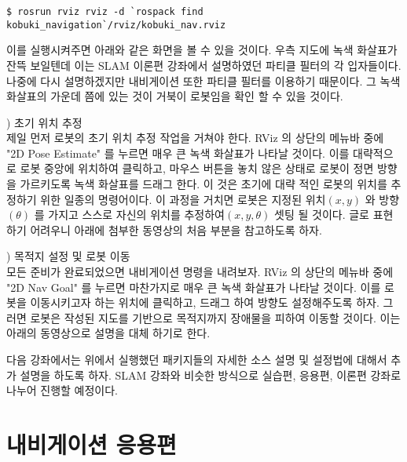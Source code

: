 \vspace{\baselineskip}
\begin{lstlisting}[language=ROS]
$ rosrun rviz rviz -d `rospack find kobuki_navigation`/rviz/kobuki_nav.rviz
\end{lstlisting}

이를 실행시켜주면 아래와 같은 화면을 볼 수 있을 것이다. 우측 지도에 녹색 화살표가 잔뜩 보일텐데 이는 SLAM 이론편 강좌에서 설명하였던 파티클 필터의 각 입자들이다. 나중에 다시 설명하겠지만 내비게이션 또한 파티클 필터를 이용하기 때문이다. 그 녹색 화살표의 가운데 쯤에 있는 것이 거북이 로봇임을 확인 할 수 있을 것이다.

\vspace{\baselineskip}
\noindent
{}
\thenum) 초기 위치 추정\\
제일 먼저 로봇의 초기 위치 추정 작업을 거쳐야 한다. RViz 의 상단의 메뉴바 중에 "2D Pose Estimate" 를 누르면 매우 큰 녹색 화살표가 나타날 것이다. 이를 대략적으로 로봇 중앙에 위치하여 클릭하고, 마우스 버튼을 놓치 않은 상태로 로봇이 정면 방향을 가르키도록 녹색 화살표를 드래그 한다. 이 것은 초기에 대략 적인 로봇의 위치를 추정하기 위한 일종의 명령어이다. 이 과정을 거치면 로봇은 지정된 위치$(x,y)$ 와 방향$(θ)$ 를 가지고 스스로 자신의 위치를 추정하여$(x, y, θ)$ 셋팅 될 것이다. 글로 표현하기 어려우니 아래에 첨부한 동영상의 처음 부분을 참고하도록 하자.

\vspace{\baselineskip}
\noindent
{}
\thenum) 목적지 설정 및 로봇 이동\\
모든 준비가 완료되었으면 내비게이션 명령을 내려보자. RViz 의 상단의 메뉴바 중에 "2D Nav Goal" 를 누르면 마찬가지로 매우 큰 녹색 화살표가 나타날 것이다. 이를 로봇을 이동시키고자 하는 위치에 클릭하고, 드래그 하여 방향도 설정해주도록 하자. 그러면 로봇은 작성된 지도를 기반으로 목적지까지 장애물을 피하여 이동할 것이다. 이는 아래의 동영상으로 설명을 대체 하기로 한다.

다음 강좌에서는 위에서 실행했던 패키지들의 자세한 소스 설명 및 설정법에 대해서 추가 설명을 하도록 하자. SLAM 강좌와 비슷한 방식으로 실습편, 응용편, 이론편 강좌로 나누어 진행할 예정이다.

\section{내비게이션 응용편}


